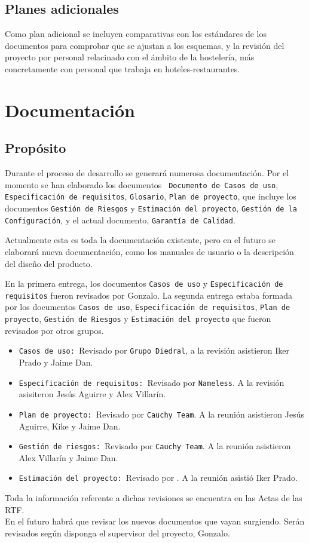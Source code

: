 \documentclass[spanish,a4paper,11pt, twoside]{report}	%
\begin{document}
	\section{ Planes adicionales}

	Como plan adicional  se incluyen comparativas con los estándares de los documentos para comprobar que se ajustan a los esquemas, y la revisión del proyecto por personal relacinado con el 
	ámbito de la hostelería, más concretamente con personal que trabaja en hoteles-restaurantes.

	


\chapter{ Documentación}%
	
	
	\section{Propósito}
			Durante el proceso de desarrollo se generará numerosa documentación.
		Por el momento se han elaborado los documentos \texttt{ Documento de Casos de uso}, \texttt{Especificación de requisitos}, \texttt{Glosario}, \texttt{Plan de proyecto}, 
		que incluye los documentos \texttt{Gestión de Riesgos} y \texttt{Estimación del proyecto}, \texttt{Gestión de la Configuración}, 
		y el actual documento, \texttt{Garantía de Calidad}.

		Actualmente esta es toda la documentación existente, pero en el futuro se elaborará nueva documentación, 
		como los manuales de usuario o la descripción del diseño del producto.

			En la primera entrega, los documentos \texttt{Casos de uso} y \texttt{Especificación de requisitos} fueron revisados por Gonzalo. 
		La segunda entrega estaba formada por los documentos \texttt{Casos de uso}, \texttt{Especificación de requisitos}, \texttt{Plan de proyecto}, 
		\texttt{Gestión de Riesgos} y \texttt{Estimación del proyecto} que fueron revisados por otros grupos.
		 \begin{itemize}
		   \item \texttt{Casos de uso: }Revisado por \texttt{Grupo Diedral}, a la revisión asistieron Iker Prado y Jaime Dan.
		   \item \texttt{Especificación de requisitos: }Revisado por \texttt{Nameless}. A la revisión asisiteron Jesús Aguirre y Alex Villarín.
		   \item \texttt{Plan de proyecto: }Revisado por \texttt{Cauchy Team}. A la reunión asistieron Jesús Aguirre, Kike y Jaime Dan.
		   \item \texttt{Gestión de riesgos: }Revisado por \texttt{Cauchy Team}. A la reunión asistieron Alex Villarín y Jaime Dan.
		   \item \texttt{Estimación del proyecto: }Revisado por \texttt{}. A la reunión asistió Iker Prado.%
		 \end{itemize}
		 Toda la información referente a dichas revisiones se encuentra en las Actas de las RTF.\\
		 En el futuro habrá que revisar los nuevos documentos que vayan surgiendo. Serán revisados según disponga el supervisor del proyecto, Gonzalo.
		 
\end{document}
